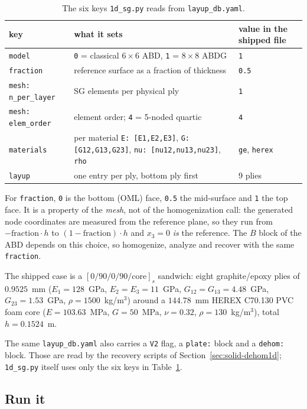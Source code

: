 \begin{table}[htbp]
\centering
\footnotesize
\begin{tabular}{lp{7.2cm}p{2.6cm}}
\toprule
key & what it sets & value in the shipped file \\
\midrule
\texttt{model} & \texttt{0} = classical $6\times6$ ABD, \texttt{1} = $8\times8$ ABDG & \texttt{1} \\
\texttt{fraction} & reference surface as a fraction of thickness & \texttt{0.5} \\
\texttt{mesh: n\_per\_layer} & SG elements per physical ply & \texttt{1} \\
\texttt{mesh: elem\_order} & element order; \texttt{4} = 5-noded quartic & \texttt{4} \\
\texttt{materials} & per material \texttt{E: [E1,E2,E3]}, \texttt{G: [G12,G13,G23]}, \texttt{nu: [nu12,nu13,nu23]}, \texttt{rho} & \texttt{ge}, \texttt{herex} \\
\texttt{layup} & one entry per ply, bottom ply first & 9 plies \\
\bottomrule
\end{tabular}
\caption{The six keys \texttt{1d\_sg.py} reads from \texttt{layup\_db.yaml}.}
\label{tab:solid-layupdb}
\end{table}

For \texttt{fraction}, \texttt{0} is the bottom (OML) face, \texttt{0.5} the
mid-surface and \texttt{1} the top face. It is a property of the \emph{mesh},
not of the homogenization call: the generated node coordinates are measured from
the reference plane, so they run from $-\text{fraction}\cdot h$ to
$(1-\text{fraction})\cdot h$ and $x_3 = 0$ \emph{is} the reference. The $B$
block of the ABD depends on this choice, so homogenize, analyze and recover with
the same \texttt{fraction}.

The shipped case is a $[0/90/0/90/\text{core}]_s$ sandwich: eight
graphite/epoxy plies of $0.9525$~mm ($E_1 = 128$~GPa, $E_2 = E_3 = 11$~GPa,
$G_{12}=G_{13}=4.48$~GPa, $G_{23}=1.53$~GPa, $\rho = 1500$~kg/m$^3$) around a
$144.78$~mm HEREX C70.130 PVC foam core ($E = 103.63$~MPa, $G = 50$~MPa,
$\nu = 0.32$, $\rho = 130$~kg/m$^3$), total $h = 0.1524$~m.

The same \texttt{layup\_db.yaml} also carries a \texttt{V2} flag, a
\texttt{plate:} block and a \texttt{dehom:} block. Those are read by the
recovery scripts of Section~\ref{sec:solid-dehom1d}; \texttt{1d\_sg.py} itself
uses only the six keys in Table~\ref{tab:solid-layupdb}.

\subsection{Run it}

